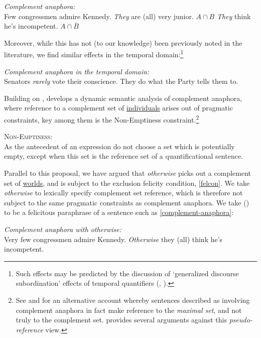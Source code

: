 \pex  \textit{Complement anaphora:}\\
Few congressmen admire Kennedy. 
\a  \textit{They} are (all) very junior. \hfill  $A\cap B$
\a  \label{complement-anaphora}\textit{They} think he's incompetent. \hfill $A\cap \overline{B}$\xe

\noindent Moreover, while this has not (to our knowledge) been previously noted in the literature, we find similar effects in the temporal domain:\footnote{Such effects may be predicted by the discussion of `generalized discourse subordination' effects of temporal quantifiers (\citealp[716ff]{Roberts1989}, \citealp[8]{Corblin1994}).}

\pex  \textit{Complement anaphora in the temporal domain:}\\
Senators \textit{rarely} vote their conscience. They do what the Party tells them to.\xe


Building on \citealt{Kibble1997}, \citet{nouwen2003} develops a dynamic semantic analysis of complement anaphora, where reference to a complement set of \uline{individuals} arises out of pragmatic constraints, key among them is the Non-Emptiness constraint.\footnote{See \citealt{Corblin1986} and \citealt{geurts1997} for an alternative account whereby sentences described as involving complement anaphora in fact make reference to the \textit{maximal set}, and not truly to the complement set. \citealt{nouwen2003} provides several arguments against this \textit{pseudo-reference} view.} 

\pex  \textsc{Non-Emptiness}:\\ As the antecedent of an expression do not choose a set which is potentially empty, except when this set is the reference set of a quantificational sentence.\xe


Parallel to this proposal, we have argued that \textit{otherwise} picks out a complement set of \uline{worlds}, and is subject to the exclusion felicity condition, \ref{felcon}. We take \textit{otherwise} to lexically specify complement set reference, which is therefore not subject to the same pragmatic constraints as complement anaphora. We take (\nextx) to be a felicitous paraphrase of a sentence such as \ref{complement-anaphora}: 

\pex  \textit{Complement anaphora with \emph{otherwise}:}\\
Very few congressmen admire Kennedy. \textit{Otherwise} they (all) think he's incompetent. \xe


